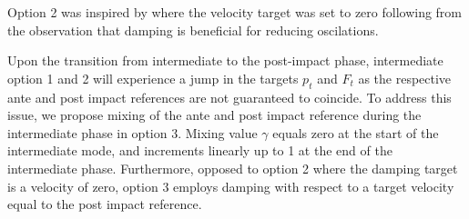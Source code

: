 \documentclass[a4paper, 10pt, conference]{ieeeconf}
\begin{document}
    Option 2 was inspired by \cite{uitendaalTeachingRobotsInteraction2022} where the velocity target was set to zero following from the observation that damping is beneficial for reducing oscilations. 

    Upon the transition from intermediate to the post-impact phase, intermediate option 1 and 2 will experience a jump in the targets $p_t$ and $F_t$ as the respective ante and post impact references are not guaranteed to coincide. To address this issue, we propose mixing of the ante and post impact reference during the intermediate phase in option 3. Mixing value $\gamma$ equals zero at the start of the intermediate mode, and increments linearly up to 1 at the end of the intermediate phase. Furthermore, opposed to option 2 where the damping target is a velocity of zero, option 3 employs damping with respect to a target velocity equal to the post impact reference.
\end{document}
